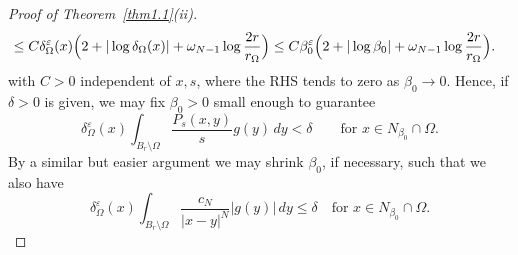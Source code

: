 \documentclass[notitlepage,11pt,reqno]{amsart}
\theoremstyle{definition}
\numberwithin{equation}{section}
\begin{document}
\begin{proof}[Proof of Theorem~\ref{thm1.1}(ii)]
\begin{align*}
&\leq C\delta^{\varepsilon}_{\Omega}(x)\Bigl(2+|\log \delta_{\Omega}(x)|+\omega_{N-1}\log\frac{2r}{r_\Omega}\Bigr)\leq C\beta_0^{\varepsilon}\Bigl(2+|\log \beta_0|+\omega_{N-1}\log\frac{2r}{r_\Omega}\Bigr).
\end{align*}
with $C>0$ independent of $x,s$, where the RHS tends to zero as $\beta_0 \to 0$. Hence, if $\delta>0$ is given, we may fix $\beta_0>0$ small enough to guarantee
\begin{equation}\label{beta0 a}
\delta^{\varepsilon}_{\Omega}(x) \int_{B_r \setminus \Omega}\frac{P_s(x, y)}{s}g(y)\, dy < \delta \qquad \text{for $x \in N_{\beta_0} \cap \Omega$.}
\end{equation}
By a similar but easier argument we may shrink $\beta_0$, if necessary, such that we also have
\begin{equation}\label{beta0 b}
\delta^{\varepsilon}_{\Omega}(x) \int_{B_r \setminus \Omega}\frac{c_N}{|x-y|^N}|g(y)|\, dy \le \delta \quad \text{for $x \in N_{\beta_0} \cap \Omega$.}
\end{equation}


\end{proof}
\end{document}
